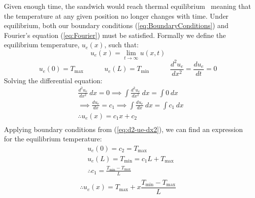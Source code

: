 Given enough time, the sandwich would reach thermal equilibrium \textendash\ meaning that the temperature at any given position no longer changes with time. Under equilibrium, both our boundary conditions (\ref{eq:BoundaryConditions}) and Fourier's equation (\ref{eq:Fourier}) must be satisfied. Formally we define the equilibrium temperature, $u_e(x)$, such that:
\begin{equation*}
    u_e(x) = \lim_{t\to\infty} u(x,t)
\end{equation*}
\begin{equation}\label{eq:d2-ue-dx2}
   u_e(0) = T_{\max} \quad \quad \quad u_e(L) = T_{\min} \quad \quad \quad \frac{d^2 u_e}{dx^2} = \frac{du_e}{dt} = 0 
\end{equation}
Solving the differential equation:
\begin{equation*}
\begin{split}
	& \frac{d^2 u_e}{dx^2} \ dx = 0 \implies \int \frac{d^2 u_e}{dx^2} \ dx = \int 0 \ dx \\
    & \implies \frac{d u_e}{dx} = c_1 \implies \int \frac{du_e}{dx} \ dx = \int c_1 \ dx\\
    &\therefore u_e(x) = c_1x + c_2 \\
\end{split}
\end{equation*}
Applying boundary conditions from (\ref{eq:d2-ue-dx2}), we can find an expression for the equilibrium temperature:
\begin{equation*}
\begin{split}
    & u_e(0) =  c_2 = T_{\max} \\
    & u_e(L) = T_{\min} = c_1L + T_{\max}\\
    &\therefore c_1 = \frac{ T_{\min}-T_{\max} }{ L } \\
\end{split}
\end{equation*}
\begin{equation} \label{eq:u_e-expression}
    \therefore u_e(x) = T_{\max} + x\frac{ T_{\min}-T_{\max} }{ L }
\end{equation}


